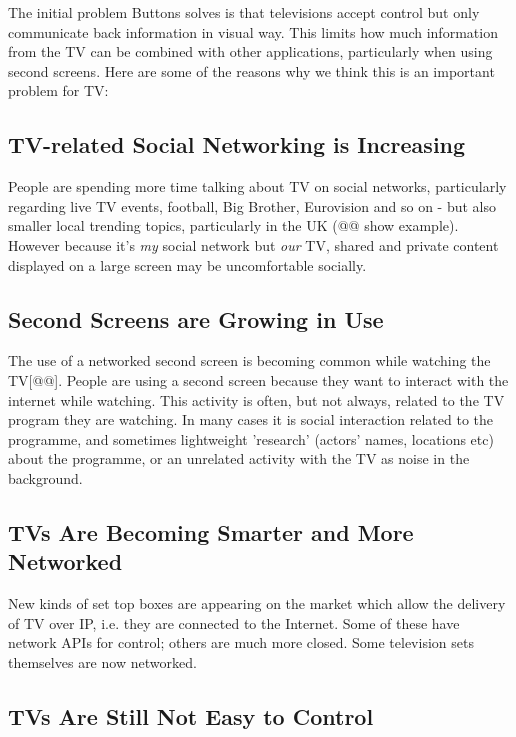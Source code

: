 \documentclass[]{article}%
\begin{document}
The initial problem Buttons solves is that televisions accept control but only communicate back information in visual way. This limits how much information from the TV can be combined with other applications, particularly when using second screens. Here are some of the reasons why we think this is an important problem for TV:

\subsection{TV-related Social Networking is Increasing}

People are spending more time talking about TV on social networks, particularly regarding live TV events, football, Big Brother, Eurovision and so on - but also smaller local trending topics, particularly in the UK (@@ show example). However because it's \emph{my} social network but \emph{our} TV, shared and private content displayed on a large screen may be uncomfortable socially.

\subsection{Second Screens are Growing in Use}

The use of a networked second screen is becoming common while watching the TV[@@]. People are using a second screen because they want to interact with the internet while watching. This activity is often, but not always, related to the TV program they are watching. In many cases it is social interaction related to the programme, and sometimes lightweight 'research' (actors' names, locations etc) about the programme, or an unrelated activity with the TV as noise in the background.

\subsection{TVs Are Becoming Smarter and More Networked}

New kinds of set top boxes are appearing on the market which allow the delivery of TV over IP, i.e. they are connected to the Internet. Some of these have network APIs for control; others are much more closed. Some television sets themselves are now networked.

\subsection{TVs Are Still Not Easy to Control}
\end{document}

